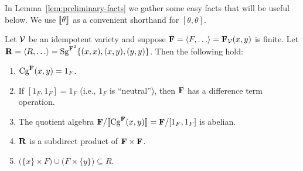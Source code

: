 In Lemma~\ref{lem:preliminary-facts} we gather
some easy facts that will be useful below.
We use $\llbracket \theta \rrbracket$ as a convenient shorthand for 
$[\theta,\theta]$. %
\begin{lemma}
\label{lem:preliminary-facts}
Let $\mathcal{V}$ be an idempotent variety and suppose 
$\bF = \<F, \dots\> = \bF_{\sV}(x,y)$ is finite. 
Let $\bR = \<R, \dots\> = \Sg^{\bF^2}\{(x, x), (x, y), (y, y)\}$. 
Then the following hold:
\begin{enumerate}
\item \label{item:1}
  $\operatorname{Cg}^{\mathbf{F}}(x,y) = 1_F$.

  \smallskip
\item \label{item:1.5}
  If $[1_F, 1_F] = 1_F$ (i.e., $1_F$ is ``neutral''), then
  $\mathbf{F}$ has a difference term operation.

\smallskip
\item \label{item:2}
The quotient algebra $\mathbf{F}/\llbracket \operatorname{Cg}^{\mathbf{F}}(x,y) \rrbracket = \mathbf{F}/[1_F,1_F]$ is abelian.


\smallskip
\item \label{item:3}
  $\mathbf{R}$ is a subdirect product of %
  $\mathbf{F}\times \mathbf{F}$.

\smallskip
\item \label{item:4}
$\bigl(\{x\} \times F\bigr) \cup \bigl(F \times \{y\}\bigr) \subseteq R$.

\end{enumerate}
\end{lemma}


\pagebreak  

